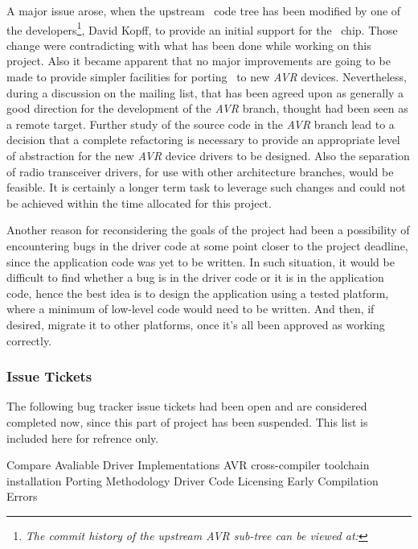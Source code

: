   A major issue arose, when the upstream \Contiki\ code tree has been
 modified by one of the developers\footnote{\emph{The commit history of
 the upstream AVR sub-tree can be viewed at:}
 },
 David Kopff, to provide an initial support for the \RFA\ chip. Those
 change were contradicting with what has been done while working on this
 project. Also it became apparent that no major improvements are going
 to be made to provide simpler facilities for porting \Contiki\ to new
 \emph{AVR} devices.
 Nevertheless, during a discussion on the mailing list, that has been
 agreed upon as generally a good direction for the development of the
 \emph{AVR} branch, thought had been seen as a remote target. Further
 study of the source code in the \emph{AVR} branch lead to a decision
 that a complete refactoring is necessary to provide an appropriate
 level of abstraction for the new \emph{AVR} device drivers to be
 designed. Also the separation of radio transceiver drivers, for use
 with other architecture branches, would be feasible. It is certainly
 a longer term task to leverage such changes and could not be achieved
 within the time allocated for this project.

  Another reason for reconsidering the goals of the project had been
 a possibility of encountering bugs in the driver code at some point
 closer to the project deadline, since the application code was yet to
 be written. In such situation, it would be difficult to find whether
 a bug is in the driver code or it is in the application code, hence
 the best idea is to design the application using a tested platform,
 where a minimum of low-level code would need to be written. And then,
 if desired, migrate it to other platforms, once it's all been approved
 as working correctly.

\subsubsection{Issue Tickets}

  The following bug tracker issue tickets had been open and are considered
 completed now, since this part of project has been suspended. This list
 is included here for refrence only.

 \begin{itemize}
	 Compare Avaliable Driver Implementations
	 AVR cross-compiler toolchain installation
	 Porting Methodology
	 Driver Code Licensing
	 Early Compilation Errors
 \end{itemize}

